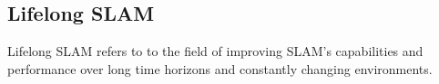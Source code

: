 \subsection{Lifelong SLAM}

Lifelong SLAM refers to to the field of improving SLAM's capabilities and performance over long time horizons and constantly changing environments. 